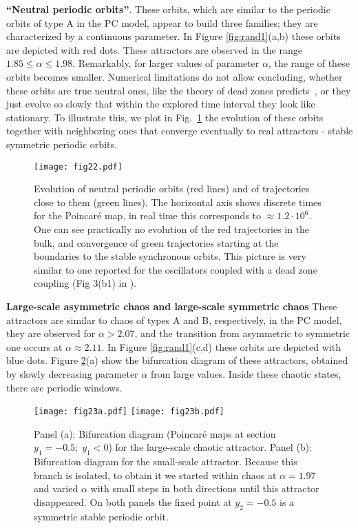 \documentclass[3p,number,review,sort&compress]{elsarticle}
\begin{document}
\textbf{``Neutral periodic orbits''}. These orbits, which are similar to the periodic 
orbits of type A in the PC model, appear to build three families; they are 
characterized by
a continuous parameter.   In Figure \ref{fig:rand1}(a,b) 
these orbits are depicted with red dots.   These attractors are observed 
in the range $1.85\leq \alpha \leq 1.98$. Remarkably, for larger values of parameter $\alpha$,
the range of these 
orbits becomes smaller.
Numerical limitations do not allow concluding, whether these
orbits are true neutral ones, like the theory of dead zones
predicts~\cite{ashwin2019state,ashwin2021dead}, or they
just evolve so slowly that within the explored time interval they look like stationary. To illustrate this, we plot in Fig.~\ref{fig:npo} the evolution of these orbits together with neighboring
ones that converge eventually to real attractors - stable symmetric periodic orbits.


\begin{figure}[!htb]
\centering
\texttt{[image: fig22.pdf]}
\caption{Evolution of neutral periodic orbits (red lines) and of trajectories close to them (green lines). The horizontal axis shows discrete times for the Poincar\'e map, in real time this corresponds to $\approx 1.2\cdot 10^6$. One can see practically no evolution of the red trajectories  in the bulk, and convergence of
green trajectories starting at the boundaries 
to the stable synchronous orbits. This picture is very similar to one reported for the oscillators coupled with a dead zone coupling (Fig 3(b1) in \cite{ashwin2021dead}). 
}
\label{fig:npo}
\end{figure}



\textbf{Large-scale asymmetric chaos and large-scale symmetric chaos} These attractors are similar to chaos of types A and B, respectively, in the PC model,  they are observed for $\alpha > 2.07$, and the transition from asymmetric to symmetric one occurs at $\alpha\approx 2.11$. 
In Figure \ref{fig:rand1}(c,d)  these orbits are depicted with blue dots. Figure \ref{fig:bdsc}(a) show the bifurcation diagram
of these attractors, obtained by slowly decreasing parameter $\alpha$ from large values. Inside these chaotic states, there are periodic windows.


\begin{figure}[!htb]
\centering
\texttt{[image: fig23a.pdf]}\hfill
\texttt{[image: fig23b.pdf]}
\caption{Panel (a): Bifurcation diagram
(Poincar\'e maps at section $y_1=-0.5;\;\dot y_1<0$) for the large-scale chaotic attractor.
Panel (b): Bifurcation diagram for the small-scale attractor.
Because this branch is isolated, 
to obtain it we started within chaos at $\alpha=1.97$ and varied $\alpha$ with small steps in both directions until this attractor disappeared. On both panels the fixed point at $y_2=-0.5$
is a symmetric stable periodic orbit.
}
\label{fig:bdsc}
\end{figure}
\end{document}
